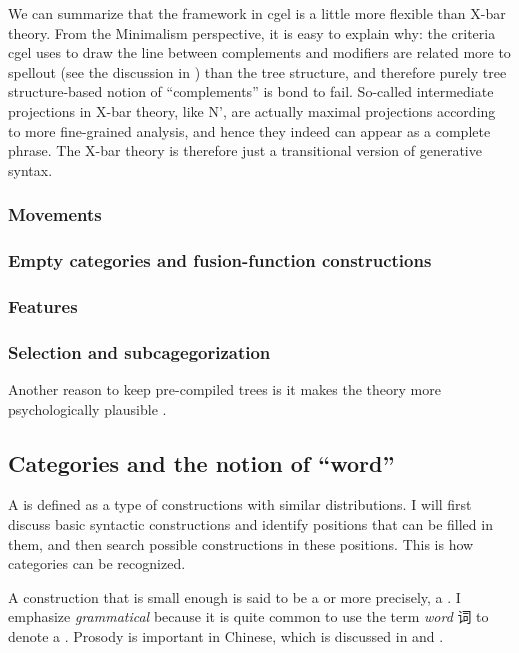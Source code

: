 \documentclass[../main.tex]{subfiles}
\begin{document}
We can summarize that the framework in \ac{cgel} is a little more flexible than X-bar theory. 
From the Minimalism perspective, it is easy to explain why: the criteria \ac{cgel} uses to draw the line 
between complements and modifiers are related more to spellout (see the discussion in )
than the tree structure, and therefore purely tree structure-based notion of ``complements'' is bond to fail. 
So-called intermediate projections in X-bar theory, like N', are actually maximal projections according to 
more fine-grained analysis, and hence they indeed can appear as a complete phrase.
The X-bar theory is therefore just a transitional version of generative syntax.

\subsubsection{Movements}

\subsubsection{Empty categories and fusion-function constructions}

\subsubsection{Features}

\subsubsection{Selection and subcagegorization}\label{sec:sub-cat}

Another reason to keep pre-compiled trees is it makes the theory more psychologically plausible \citep{brain-syntax-1,brain-syntax-2}.

\subsection{Categories and the notion of ``word''}

A  is defined as a type of constructions with similar distributions.
I will first discuss basic syntactic constructions and identify positions that can be filled in them, 
and then search possible constructions in these positions. This is how categories can be recognized.

A construction that is small enough is said to be a  or more precisely, 
a .
I emphasize \emph{grammatical} because it is quite common to use the term \emph{word} 词 to denote 
a . Prosody is important in Chinese, which is discussed in 
 and . 
\end{document}
